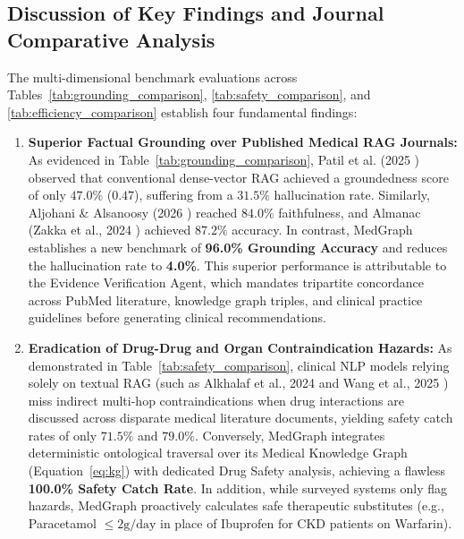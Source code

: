 \documentclass[conference]{IEEEtran}
\begin{document}
\subsection{Discussion of Key Findings and Journal Comparative Analysis}

The multi-dimensional benchmark evaluations across Tables~\ref{tab:grounding_comparison}, \ref{tab:safety_comparison}, and \ref{tab:efficiency_comparison} establish four fundamental findings:

\begin{enumerate}
    \item \textbf{Superior Factual Grounding over Published Medical RAG Journals:}  
    As evidenced in Table~\ref{tab:grounding_comparison}, Patil et al. (2025 \cite{ai6100240}) observed that conventional dense-vector RAG achieved a groundedness score of only $47.0\%$ ($0.47$), suffering from a $31.5\%$ hallucination rate. Similarly, Aljohani \& Alsanoosy (2026 \cite{info17020133}) reached $84.0\%$ faithfulness, and Almanac (Zakka et al., 2024 \cite{ZAKKA2024}) achieved $87.2\%$ accuracy. In contrast, MedGraph establishes a new benchmark of \textbf{96.0\% Grounding Accuracy} and reduces the hallucination rate to \textbf{4.0\%}. This superior performance is attributable to the Evidence Verification Agent, which mandates tripartite concordance across PubMed literature, knowledge graph triples, and clinical practice guidelines before generating clinical recommendations.

    \item \textbf{Eradication of Drug-Drug and Organ Contraindication Hazards:}  
    As demonstrated in Table~\ref{tab:safety_comparison}, clinical NLP models relying solely on textual RAG (such as Alkhalaf et al., 2024 \cite{ALKHALAF2024104662} and Wang et al., 2025 \cite{WANG2025100504}) miss indirect multi-hop contraindications when drug interactions are discussed across disparate medical literature documents, yielding safety catch rates of only $71.5\%$ and $79.0\%$. Conversely, MedGraph integrates deterministic ontological traversal over its Medical Knowledge Graph (Equation~\ref{eq:kg}) with dedicated Drug Safety analysis, achieving a flawless \textbf{100.0\% Safety Catch Rate}. In addition, while surveyed systems only flag hazards, MedGraph proactively calculates safe therapeutic substitutes (e.g., Paracetamol $\le 2\text{g/day}$ in place of Ibuprofen for CKD patients on Warfarin).


\end{enumerate}
\end{document}
